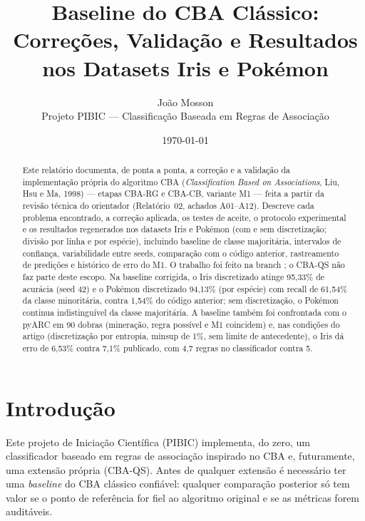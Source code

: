 \documentclass[a4paper,11pt]{article}
\title{Baseline do CBA Cl\'assico: Corre\c{c}\~oes, Valida\c{c}\~ao e Resultados\\ nos Datasets Iris e Pok\'emon}
\author{Jo\~ao Mosson\\[0.3em]\small Projeto PIBIC --- Classifica\c{c}\~ao Baseada em Regras de Associa\c{c}\~ao}
\date{\today}
\newcommand{\code}[1]{\texttt{\detokenize{#1}}}
\begin{document}
\maketitle

\begin{abstract}
Este relat\'orio documenta, de ponta a ponta, a corre\c{c}\~ao e a valida\c{c}\~ao da implementa\c{c}\~ao pr\'opria do algoritmo CBA (\emph{Classification Based on Associations}, Liu, Hsu e Ma, 1998) --- etapas CBA-RG e CBA-CB, variante M1 --- feita a partir da revis\~ao t\'ecnica do orientador (Relat\'orio~02, achados A01--A12). Descreve cada problema encontrado, a corre\c{c}\~ao aplicada, os testes de aceite, o protocolo experimental e os resultados regenerados nos datasets Iris e Pok\'emon (com e sem discretiza\c{c}\~ao; divis\~ao por linha e por esp\'ecie), incluindo baseline de classe majorit\'aria, intervalos de confian\c{c}a, variabilidade entre seeds, compara\c{c}\~ao com o c\'odigo anterior, rastreamento de predi\c{c}\~oes e histórico de erro do M1. O trabalho foi feito na branch \code{Baseline}; o CBA-QS n\~ao faz parte deste escopo. Na baseline corrigida, o Iris discretizado atinge 95,33\% de acur\'acia (seed 42) e o Pok\'emon discretizado 94,13\% (por esp\'ecie) com recall de 61,54\% da classe minorit\'aria, contra 1,54\% do c\'odigo anterior; sem discretiza\c{c}\~ao, o Pok\'emon continua indistingu\'ivel da classe majorit\'aria. A baseline tamb\'em foi confrontada com o pyARC em 90 dobras (minera\c{c}\~ao, regra poss\'ivel e M1 coincidem) e, nas condi\c{c}\~oes do artigo (discretiza\c{c}\~ao por entropia, minsup de 1\%, sem limite de antecedente), o Iris dá erro de 6,53\% contra 7,1\% publicado, com 4,7 regras no classificador contra 5.
\end{abstract}

\tableofcontents
\newpage

\section{Introdu\c{c}\~ao}

Este projeto de Inicia\c{c}\~ao Cient\'ifica (PIBIC) implementa, do zero, um classificador baseado em regras de associa\c{c}\~ao inspirado no CBA e, futuramente, uma extens\~ao pr\'opria (CBA-QS). Antes de qualquer extens\~ao \'e necess\'ario ter uma \emph{baseline} do CBA cl\'assico confi\'avel: qualquer comparação posterior só tem valor se o ponto de refer\^encia for fiel ao algoritmo original e se as m\'etricas forem auditáveis.
\end{document}
